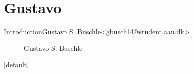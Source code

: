 \section{Gustavo}

\begin{frame}{Introduction}{Gustavo S. Buschle\newline<gbusch14@student.aau.dk>}
	\begin{figure}[h!]
		\caption{Gustavo S. Buschle}
		\centering    		
	\end{figure}
\end{frame}
[default]
